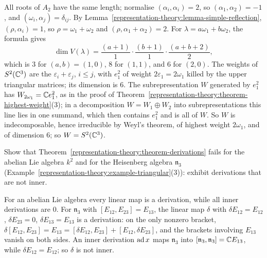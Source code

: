 \begin{solution}
All roots of $A_2$ have the same length; normalise $(\alpha_i, \alpha_i) = 2$, so $(\alpha_1, \alpha_2) = -1$, and $(\omega_i, \alpha_j) = \delta_{ij}$. By
Lemma~\ref{representation-theory:lemma-simple-reflection}, $(\rho, \alpha_i) = 1$, so $\rho = \omega_1 + \omega_2$ and $(\rho, \alpha_1 + \alpha_2) = 2$. For
$\lambda = a\omega_1 + b\omega_2$, the formula gives
\[
\dim V(\lambda) = \frac{(a + 1)}{1}\cdot\frac{(b + 1)}{1}\cdot\frac{(a + b + 2)}{2},
\]
which is $3$ for $(a, b) = (1, 0)$, $8$ for $(1, 1)$, and $6$ for $(2, 0)$. The weights of $S^2(\mathbb{C}^3)$ are the $\varepsilon_i + \varepsilon_j$, $i \leq j$, with $e_1^2$ of weight
$2\varepsilon_1 = 2\omega_1$ killed by the upper triangular matrices; its dimension is $6$. The subrepresentation $W$ generated by $e_1^2$ has $W_{2\omega_1} = \mathbb{C} e_1^2$, as in the proof of
Theorem~\ref{representation-theory:theorem-highest-weight}(3); in a decomposition $W = W_1 \oplus W_2$ into subrepresentations this line lies in one summand, which then contains $e_1^2$ and
is all of $W$. So $W$ is indecomposable, hence irreducible by Weyl's theorem, of highest weight $2\omega_1$, and of dimension $6$; so $W = S^2(\mathbb{C}^3)$.
\end{solution}

\begin{exercise}\label{representation-theory:exercise-derivations-not-inner}
Show that Theorem~\ref{representation-theory:theorem-derivations} fails for the abelian Lie algebra $k^2$ and for the Heisenberg algebra $\mathfrak{n}_3$
(Example~\ref{representation-theory:example-triangular}(3)): exhibit derivations that are not inner.
\end{exercise}

\begin{solution}
For an abelian Lie algebra every linear map is a derivation, while all inner derivations are $0$. For $\mathfrak{n}_3$ with $[E_{12}, E_{23}] = E_{13}$, the linear map $\delta$ with
$\delta E_{12} = E_{12}$, $\delta E_{23} = 0$, $\delta E_{13} = E_{13}$ is a derivation: on the only nonzero bracket, $\delta[E_{12}, E_{23}] = E_{13} = [\delta E_{12}, E_{23}] + [E_{12},
\delta E_{23}]$, and the brackets involving $E_{13}$ vanish on both sides. An inner derivation $\operatorname{ad} x$ maps $\mathfrak{n}_3$ into $[\mathfrak{n}_3, \mathfrak{n}_3] = \mathbb{C} E_{13}$, while
$\delta E_{12} = E_{12}$; so $\delta$ is not inner.
\end{solution}
